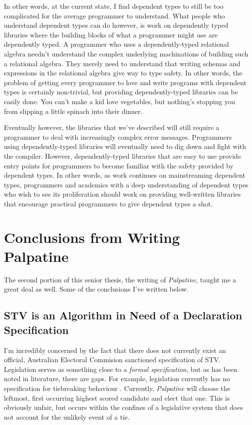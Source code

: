 In other words, at the current state, I find dependent types to still be too
complicated for the average programmer to understand. What people who understand
dependent types can do however, is work on dependently typed libraries where the
building blocks of what a programmer might use are dependently typed. A
programmer who uses a dependently-typed relational algebra needn't understand
the complex underlying machinations of building such a relational algebra. They
merely need to understand that writing schemas and expressions in the relational
algebra give way to type safety. In other words, the problem of getting every
programmer to love and write programs with dependent types is certainly
non-trivial, but providing dependently-typed libraries can be easily done. You
can't make a kid love vegetables, but nothing's stopping you from slipping a
little spinach into their dinner. 

Eventually however, the libraries that we've described will still require a
programmer to deal with increasingly complex error messages. Programmers using
dependently-typed libraries will eventually need to dig down and fight with the
compiler. However, dependently-typed libraries that are easy to use provide
entry points for programmers to become familiar with the safety provided by
dependent types. In other words, as work continues on mainstreaming dependent
types, programmers and academics with a deep understanding of dependent types
who wish to see its proliferation should work on providing well-written
libraries that encourage practical programmers to give dependent types a shot.

\section{Conclusions from Writing Palpatine}

The second portion of this senior thesis, the writing of \textit{Palpatine},
taught me a great deal as well. Some of the conclusions I've written below. 

\subsection{STV is an Algorithm in Need of a Declaration Specification}

I'm incredibly concerned by the fact that there does not currently exist an
official, Australian Electoral Commision sanctioned specification of STV.
Legislation serves as something close to a \textit{formal specification}, but as
has been noted in literature, there are gaps. For example, legislation currently
has no specification for tiebreaking behaviour \cite{stv_haskell}. Currently,
\textit{Palpatine} will choose the leftmost, first occurring highest scored
candidate and elect that one. This is obviously unfair, but occurs within the
confines of a legislative system that does not account for the unlikely event of
a tie. 

